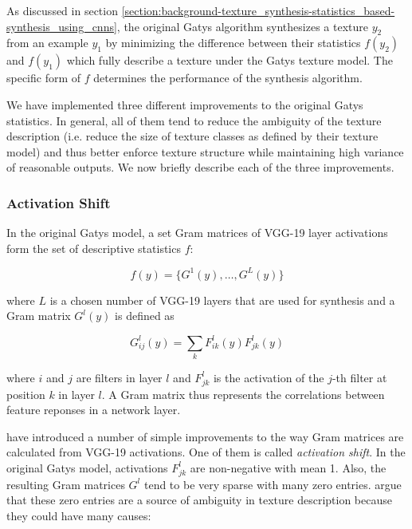 As discussed in section \ref{section:background-texture_synthesis-statistics_based-synthesis_using_cnns}, the original Gatys algorithm synthesizes a texture \(y_2\) from an example \(y_1\) by minimizing the difference between their statistics \(f(y_2)\) and \(f(y_1)\) which fully describe a texture under the Gatys texture model. The specific form of \(f\) determines the performance of the synthesis algorithm.

We have implemented three different improvements to the original Gatys statistics. In general, all of them tend to reduce the ambiguity of the texture description (i.e. reduce the size of texture classes as defined by their texture model) and thus better enforce texture structure while maintaining high variance of reasonable outputs. We now briefly describe each of the three improvements.

\subsubsection{Activation Shift}
\label{section:methods-texture_model-improvements-activation_shift}

In the original Gatys model, a set Gram matrices of VGG-19 layer activations form the set of descriptive statistics \(f\):

\begin{equation}
    \label{eq:gatys_statistics}
    f(y) = \{G^1(y), \dots, G^L(y)\}
\end{equation}

where \(L\) is a chosen number of VGG-19 layers that are used for synthesis and a Gram matrix \(G^l(y)\) is defined as

\begin{equation}
    \label{eq:gram_style}
    G_{ij}^l(y) = \sum_k F_{ik}^l(y) F_{jk}^l(y)
\end{equation}

where \(i\) and \(j\) are filters in layer \(l\) and \(F_{jk}^l\) is the activation of the \(j\)-th filter at position \(k\) in layer \(l\). A Gram matrix thus represents the correlations between feature reponses in a network layer.

\citet{Novak2016} have introduced a number of simple improvements to the way Gram matrices are calculated from VGG-19 activations. One of them is called \textit{activation shift}. In the original Gatys model, activations \(F_{jk}^l\) are non-negative with mean 1. Also, the resulting Gram matrices \(G^l\) tend to be very sparse with many zero entries. \citet{Novak2016} argue that these zero entries are a source of ambiguity in texture description because they could have many causes:

